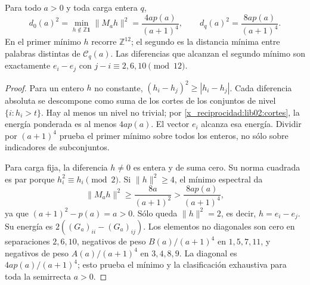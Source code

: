\begin{theorem}
\label{x_reciprocidad:lib02:distancias}
Para todo \(a>0\) y toda carga entera \(q\),
\begin{equation}
 d_0(a)^2=\min_{h\notin\mathbb Z\mathbf1}\|M_ah\|^2
 =\frac{4ap(a)}{(a+1)^4},\qquad
 d_q(a)^2=\frac{8ap(a)}{(a+1)^4}.
 \label{x_reciprocidad:lib02:distancias-exactas}
\end{equation}
En el primer mínimo \(h\) recorre \(\mathbb Z^{12}\); el segundo
es la distancia mínima entre palabras distintas de \(\mathcal C_q(a)\).
Las diferencias que alcanzan el segundo mínimo son exactamente
\(e_i-e_j\) con \(j-i\equiv2,6,10\pmod{12}\).
\end{theorem}
\begin{proof}
Para un entero \(h\) no constante,
\((h_i-h_j)^2\geq|h_i-h_j|\). Cada diferencia absoluta se
descompone como suma de los cortes de los conjuntos de nivel
\(\{i:h_i>t\}\). Hay al menos un nivel no trivial; por
\cref{x_reciprocidad:lib02:cortes}, la energía ponderada es al menos \(4ap(a)\).
El vector \(e_i\) alcanza esa energía. Dividir por \((a+1)^4\)
prueba el primer mínimo sobre todos los enteros, no sólo sobre
indicadores de subconjuntos.

Para carga fija, la diferencia \(h\ne0\) es entera y de suma cero.
Su norma cuadrada es par porque \(h_i^2\equiv h_i\pmod2\). Si
\(\|h\|^2\geq4\), el mínimo espectral da
\[
 \|M_ah\|^2\geq\frac{8a}{(a+1)^2}
 >\frac{8ap(a)}{(a+1)^4},
\]
ya que \((a+1)^2-p(a)=a>0\). Sólo queda
\(\|h\|^2=2\), es decir, \(h=e_i-e_j\). Su energía es
\(2((G_a)_{ii}-(G_a)_{ij})\). Los elementos no diagonales son cero
en separaciones \(2,6,10\), negativos de peso \(B(a)/(a+1)^4\)
en \(1,5,7,11\), y negativos de peso \(A(a)/(a+1)^4\) en
\(3,4,8,9\). La diagonal es \(4ap(a)/(a+1)^4\); esto prueba el
mínimo y la clasificación exhaustiva para toda la semirrecta \(a>0\).
\end{proof}

